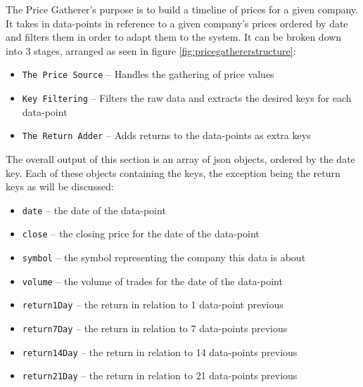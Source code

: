The Price Gatherer's purpose is to build a timeline of prices for a given company. It takes in data-points in reference to a given company's prices ordered by date and filters them in order to adapt them to the system. It can be broken down into 3 stages, arranged as seen in figure \ref{fig:pricegathererstructure}:
\begin{itemize}
    \item \texttt{The Price Source} -- Handles the gathering of price values
    \item \texttt{Key Filtering} -- Filters the raw data and extracts the desired keys for each data-point
    \item \texttt{The Return Adder} -- Adds returns to the data-points as extra keys
\end{itemize}

The overall output of this section is an array of json objects, ordered by the date key. Each of these objects containing the keys, the exception being the return keys as will be discussed:
\begin{itemize}
    \item \texttt{date} -- the date of the data-point
    \item \texttt{close} -- the closing price for the date of the data-point
    \item \texttt{symbol} -- the symbol representing the company this data is about
    \item \texttt{volume} -- the volume of trades for the date of the data-point
    \item \texttt{return1Day} -- the return in relation to 1 data-point previous
    \item \texttt{return7Day} -- the return in relation to 7 data-points previous
    \item \texttt{return14Day} -- the return in relation to 14 data-points previous
    \item \texttt{return21Day} -- the return in relation to 21 data-points previous
\end{itemize}

